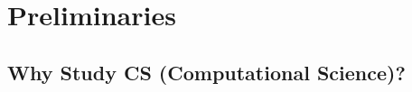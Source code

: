 \documentclass[sigconf,review,anonymous]{acmart}
\newcommand{\bi}{\begin{itemize}}
\begin{document}





 
 

\section{Preliminaries  } 

\subsection{Why Study CS (Computational Science)?}
\end{document}
